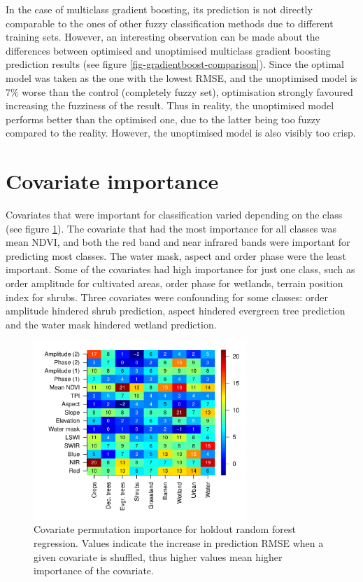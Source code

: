 \documentclass[a4paper,12pt]{scrbook}
\begin{document}
In the case of multiclass gradient boosting, its prediction is not directly comparable to the ones of other fuzzy classification methods due to different training sets. However, an interesting observation can be made about the differences between optimised and unoptimised multiclass gradient boosting prediction results (see figure \ref{fig-gradientboost-comparison}). Since the optimal model was taken as the one with the lowest RMSE, and the unoptimised model is 7\% worse than the control (completely fuzzy set), optimisation strongly favoured increasing the fuzziness of the result. Thus in reality, the unoptimised model performs better than the optimised one, due to the latter being too fuzzy compared to the reality. However, the unoptimised model is also visibly too crisp.

\section{Covariate importance}

Covariates that were important for classification varied depending on the class (see figure \ref{fig-variable-importance}). The covariate that had the most importance for all classes was mean NDVI, and both the red band and near infrared bands were important for predicting most classes. The water mask, aspect and  order phase were the least important. Some of the covariates had high importance for just one class, such as  order amplitude for cultivated areas,  order phase for wetlands, terrain position index for shrubs. Three covariates were confounding for some classes:  order amplitude hindered shrub prediction, aspect hindered evergreen tree prediction and the water mask hindered wetland prediction.

\begin{figure}
  \centering
  \includegraphics[width=0.72\textwidth]{thesis-figures/variable-importance}
  \caption{Covariate permutation importance for holdout random forest regression. Values indicate the increase in prediction RMSE when a given covariate is shuffled, thus higher values mean higher importance of the covariate.}
  \label{fig-variable-importance}
\end{figure}
\end{document}
